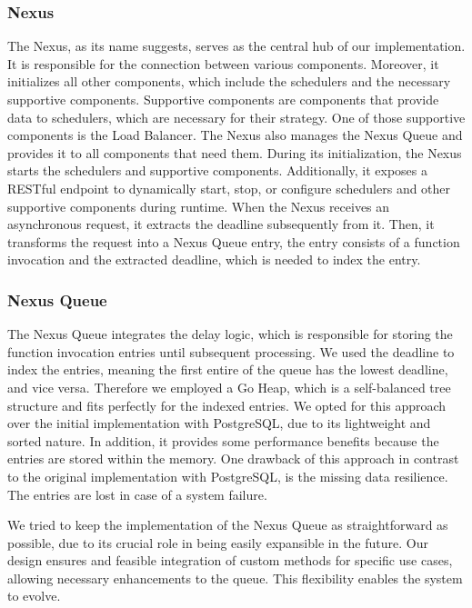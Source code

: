 \subsubsection{Nexus}
\label{sec:nexus}
The Nexus, as its name suggests, serves as the central hub of our implementation. It is responsible for the connection between various components. Moreover, it initializes all other components, which include the schedulers and the necessary supportive components. Supportive components are components that provide data to schedulers, which are necessary for their strategy. One of those supportive components is the Load Balancer. The Nexus also manages the Nexus Queue and provides it to all components that need them. During its initialization, the Nexus starts the schedulers and supportive components. Additionally, it exposes a RESTful endpoint to dynamically start, stop, or configure schedulers and other supportive components during runtime. When the Nexus receives an asynchronous request, it extracts the deadline subsequently from it. Then, it transforms the request into a Nexus Queue entry, the entry consists of a function invocation and the extracted deadline, which is needed to index the entry.

\subsubsection{Nexus Queue}
\label{sec:nexus-queue}
The Nexus Queue integrates the delay logic, which is responsible for storing the function invocation entries until subsequent processing. We used the deadline to index the entries, meaning the first entire of the queue has the lowest deadline, and vice versa. Therefore we employed a Go Heap, which is a self-balanced tree structure and fits perfectly for the indexed entries. We opted for this approach over the initial implementation with PostgreSQL, due to its lightweight and sorted nature. In addition, it provides some performance benefits because the entries are stored within the memory. One drawback of this approach in contrast to the original implementation with PostgreSQL, is the missing data resilience. The entries are lost in case of a system failure.

We tried to keep the implementation of the Nexus Queue as straightforward as possible, due to its crucial role in being easily expansible in the future. Our design ensures and feasible integration of custom methods for specific use cases, allowing necessary enhancements to the queue. This flexibility enables the system to evolve.

